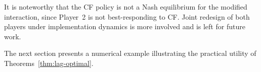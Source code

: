 \documentclass[letterpaper, 10 pt, conference]{ieeeconf}  %
\newtheorem{remark}{\textbf{Remark}}
\begin{document}

It is noteworthy that the CF policy is not a Nash equilibrium for the modified interaction, since Player~2 is not best-responding to CF. Joint redesign of both players under implementation dynamics is more involved and is left for future work.

The next section presents a numerical example illustrating the practical utility of Theorems~\ref{thm:lag-optimal}.


\end{document}
